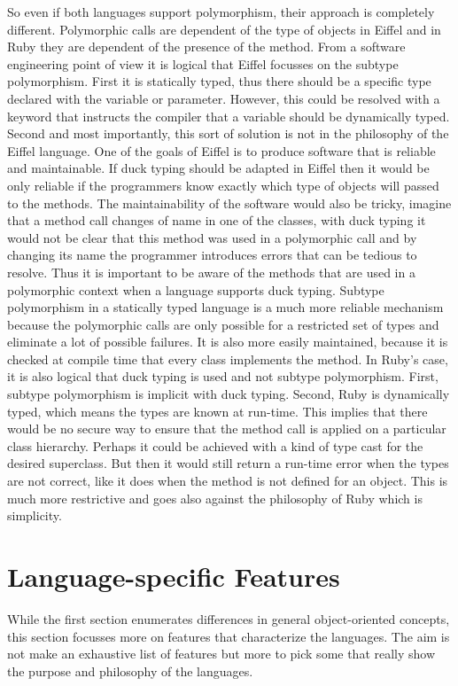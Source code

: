 \documentclass[12pt,a4paper,twocolumn]{article}
\begin{document}
So even if both languages support polymorphism, their approach is completely different. Polymorphic calls are dependent of the type of objects in Eiffel and in Ruby they are dependent of the presence of the method. From a software engineering point of view it is logical that Eiffel focusses on the subtype polymorphism. First it is statically typed, thus there should be a specific type declared with the variable or parameter. However, this could be resolved with a keyword that instructs the compiler that a variable should be dynamically typed. Second and most importantly, this sort of solution is not in the philosophy of the Eiffel language. One of the goals of Eiffel is to produce software that is reliable and maintainable. If duck typing should be adapted in Eiffel then it would be only reliable if the programmers know exactly which type of objects will passed to the methods. The maintainability of the software would also be tricky, imagine that a method call changes of name in one of the classes, with duck typing it would not be clear that this method was used in a polymorphic call and by changing its name the programmer introduces errors that can be tedious to resolve. Thus it is important to be aware of the methods that are used in a polymorphic context when a language supports duck typing. Subtype polymorphism in a statically typed language is a much more reliable mechanism because the polymorphic calls are only possible for a restricted set of types and eliminate a lot of possible failures. It is also more easily maintained, because it is checked at compile time that every class implements the method. In Ruby's case, it is also logical that duck typing is used and not subtype polymorphism. First, subtype polymorphism is implicit with duck typing. Second, Ruby is dynamically typed, which means the types are known at run-time. This implies that there would be no secure way to ensure that the method call is applied on a particular class hierarchy. Perhaps it could be achieved with a kind of type cast for the desired superclass. But then it would still return a run-time error when the types are not correct, like it does when the method is not defined for an object. This is much more restrictive and goes also against the philosophy of Ruby which is simplicity.
\section{Language-specific Features}
While the first section enumerates differences in general object-oriented concepts, this section focusses more on features that characterize the languages. The aim is not make an exhaustive list of features but more to pick some that really show the purpose and philosophy of the languages.
\end{document}
